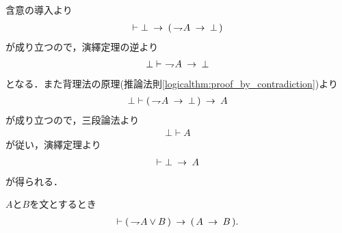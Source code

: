 	\begin{prf}
		含意の導入より
		\begin{align}
			\vdash \bot \hspace{0.25em}\rightarrow\hspace{0.25em} (\, \rightharpoondown\hspace{-0.25em} A \hspace{0.25em}\rightarrow\hspace{0.25em} \bot\, )
		\end{align}
		が成り立つので，演繹定理の逆より
		\begin{align}
			\bot \vdash\ \rightharpoondown\hspace{-0.25em} A \hspace{0.25em}\rightarrow\hspace{0.25em} \bot
		\end{align}
		となる．また背理法の原理(推論法則\ref{logicalthm:proof_by_contradiction})より
		\begin{align}
			\bot \vdash (\, \rightharpoondown\hspace{-0.25em} A \hspace{0.25em}\rightarrow\hspace{0.25em} \bot\, ) \hspace{0.25em}\rightarrow\hspace{0.25em} A
		\end{align}
		が成り立つので，三段論法より
		\begin{align}
			\bot \vdash A
		\end{align}
		が従い，演繹定理より
		\begin{align}
			\vdash \bot \hspace{0.25em}\rightarrow\hspace{0.25em} A
		\end{align}
		が得られる．
		\QED
	\end{prf}
	
	\begin{screen}
		\begin{logicalthm}[否定の論理和は含意で書ける]
		\label{logicalthm:disjunction_of_negation_rewritable_by_implication}
			$A$と$B$を文とするとき
			\begin{align}
				\vdash (\, \rightharpoondown\hspace{-0.25em} A \vee B\, ) \hspace{0.25em}\rightarrow\hspace{0.25em} (\, A \hspace{0.25em}\rightarrow\hspace{0.25em} B\, ).
			\end{align}
		\end{logicalthm}
	\end{screen}
	
